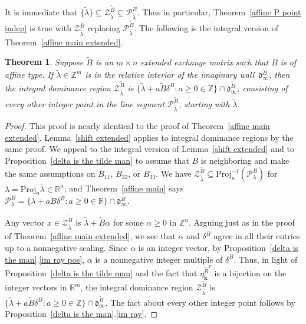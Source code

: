 \documentclass{amsart}
\newtheorem{theorem}[proposition]{Theorem}
\theoremstyle{definition}
\theoremstyle{remark}
\numberwithin{equation}{section}
\newcommand{\integers}{\mathbb Z}
\newcommand{\reals}{\mathbb R}
\newcommand{\set}[1]{{\lbrace #1 \rbrace}}
\newcommand{\0}{{\mathbf{0}}}
\newcommand{\Proj}{\mathrm{Proj}}
\newcommand{\kk}{{\boldsymbol{k}}}
\newcommand{\tB}{{\widetilde{B}}}
\renewcommand{\P}{\mathcal{P}}
\newcommand{\IP}{\mathcal{Z}}
\renewcommand{\d}{{\mathfrak d}}
\begin{document}
It is immediate that $\set{\tilde\lambda}\subseteq\IP^\tB_{\tilde\lambda}\subseteq\P^\tB_{\tilde\lambda}$.   
Thus in particular, Theorem~\ref{affine P point indep} is true with $\IP_{\tilde\lambda}^\tB$ replacing $\P_{\tilde\lambda}^\tB$.
The following is the integral version of Theorem~\ref{affine main extended}.

\begin{theorem}\label{affine main integral}  
  Suppose $\tB$ is an $m\times n$ extended exchange matrix such that $B$ is of affine type.
  If $\tilde\lambda\in\integers^m$ is in the relative interior of the imaginary wall~$\d^\tB_\infty$, then the integral dominance region $\IP^\tB_{\tilde\lambda}$ is $\set{\tilde\lambda+a\tB\delta^B:a\ge0\in\integers}\cap\d^\tB_\infty$, consisting of every other integer point in the line segment $\P^\tB_{\tilde\lambda}$, starting with $\tilde\lambda$.
\end{theorem}

\begin{proof}
This proof is nearly identical to the proof of Theorem~\ref{affine main extended}.
Lemma~\ref{shift extended} applies to integral dominance regions by the same proof.
We appeal to the integral version of Lemma~\ref{shift extended} and to Proposition~\ref{delta is the tilde man} to assume that $B$ is neighboring and make the same assumptions on $B_{11}$, $B_{22}$, or $B_{33}$.
  We have $\IP_{\tilde\lambda}^\tB\subseteq\Proj_n^{-1}(\P_{\lambda}^B)$ for $\lambda=\Proj_n\tilde\lambda\in\reals^n$, and Theorem~\ref{affine main} says $\P_{\lambda}^B=\set{\lambda+aB\delta^B:a\ge0\in\reals}\cap\d^B_\infty$.

Any vector $x\in\IP_{\tilde\lambda}^\tB$ is $\tilde\lambda+\tB\alpha$ for some $\alpha\ge0$ in $\integers^n$.
Arguing just as in the proof of Theorem~\ref{affine main extended}, we see that $\alpha$ and $\delta^B$ agree in all their entries up to a nonnegative scaling.
Since $\alpha$ is an integer vector, by Proposition~\ref{delta is the man}.\ref{im ray pos}, $\alpha$ is a nonnegative integer multiple of $\delta^B$.
Thus, in light of Proposition~\ref{delta is the tilde man} and the fact that $\eta^{\tB^T}_\kk$ is a bijection on the integer vectors in $\reals^m$, the integral dominance region $\IP^\tB_{\tilde\lambda}$ is $\set{\tilde\lambda+a\tB\delta^B:a\ge0\in\integers}\cap\d^\tB_\infty$.
The fact about every other integer point follows by Proposition~\ref{delta is the man}.\ref{im ray}.
\end{proof}
\end{document}
